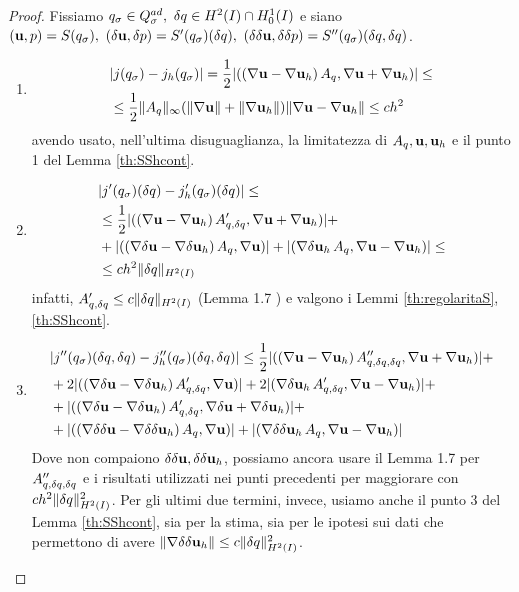 \begin{proof}
	Fissiamo $\qs\in\Q_\sigma,\ \dq\in H^2(I)\cap H^1_0(I)$ e siano $(\u,p)=S(\qs),\ (\du,\delta p)=S'(\qs)(\dq),\ (\delta\du,\delta\delta p)=S''(\qs)(\dq,\dq)$.
\begin{enumerate}
\item
	\begin{equation*}\begin{split}
		&|j({q_\sigma})-j_h({q_\sigma})| = \frac{1}{2}|((\nabla\mathbf{u}-\nabla\mathbf{u}_h)\,A_q,\nabla\mathbf{u}+\nabla\mathbf{u}_h)|\leq\\
		&\leq\frac{1}{2}\|A_q\|_\infty(\|\nabla\mathbf{u}\|+\|\nabla\mathbf{u}_h\|)\|\nabla\mathbf{u}-\nabla\mathbf{u}_h\|\leq ch^2
	\end{split}\end{equation*}
	avendo usato, nell'ultima disuguaglianza, la limitatezza di $A_q,\mathbf{u},\mathbf{u}_h$ e il punto 1 del Lemma \ref{th:SShcont}.
\item
	\begin{equation*}\begin{split}
	&|j'({q_\sigma})({\delta q})-j_h'({q_\sigma})({\delta q})|\leq\\
	&\leq\frac{1}{2}|((\nabla\mathbf{u}-\nabla\mathbf{u}_h)\,A'_{q,{\delta q}},\nabla\mathbf{u}+\nabla\mathbf{u}_h)|+\\
	&+|((\nabla\mathbf{\delta u}-\nabla\mathbf{\delta u}_h)\,A_q,\nabla\mathbf{u})| + |(\nabla\mathbf{\delta u}_h\,A_q,\nabla\mathbf{u}-\nabla\mathbf{u}_h)|\leq\\
	&\leq ch^2\|{\delta q}\|_{H^2(I)}
	\end{split}\end{equation*}
	infatti, $A'_{q,{\delta q}}\leq c\|{\delta q}\|_{H^2(I)}$ (Lemma 1.7 \cite{Kinigera}) e valgono i Lemmi \ref{th:regolaritaS}, \ref{th:SShcont}.
\item
	\begin{equation*}\begin{split}
	&|j''({q_\sigma})({\delta q},{\delta q})-j_h''({q_\sigma})({\delta q},{\delta q})|\leq\frac{1}{2}|((\nabla\mathbf{u}-\nabla\mathbf{u}_h)\,A''_{q,{\delta q},{\delta q}},\nabla\mathbf{u}+\nabla\mathbf{u}_h)|+\\
	&+2|((\nabla\mathbf{\delta u}-\nabla\mathbf{\delta u}_h)\,A'_{q,{\delta q}},\nabla\mathbf{u})| + 2|(\nabla\mathbf{\delta u}_h\,A'_{q,{\delta q}},\nabla\mathbf{u}-\nabla\mathbf{u}_h)|+\\
	&+|((\nabla\mathbf{\delta u}-\nabla\mathbf{\delta u}_h)\,A'_{q,{\delta q}},\nabla\mathbf{\delta u}+\nabla\mathbf{\delta u}_h)|+\\
	&+|((\nabla\delta\mathbf{\delta u}-\nabla\delta\mathbf{\delta u}_h)\,A_q,\nabla\mathbf{u})| + |(\nabla\delta\mathbf{\delta u}_h\,A_q,\nabla\mathbf{u}-\nabla\mathbf{u}_h)|
	\end{split}\end{equation*}
	Dove non compaiono $\delta\mathbf{\delta u},\delta\mathbf{\delta u}_h$, possiamo ancora usare il Lemma 1.7 \cite{Kinigera} per $A''_{q,{\delta q},{\delta q}}$ e i risultati utilizzati nei punti precedenti per maggiorare con $ch^2\|{\delta q}\|_{H^2(I)}^2$. Per gli ultimi due termini, invece, usiamo anche il punto 3 del Lemma \ref{th:SShcont}, sia per la stima, sia per le ipotesi sui dati che permettono di avere $\|\nabla\delta\mathbf{\delta u}_h\|\leq c\|{\delta q}\|_{H^2(I)}^2$.
\end{enumerate}\end{proof}
\ \\ \ \\

